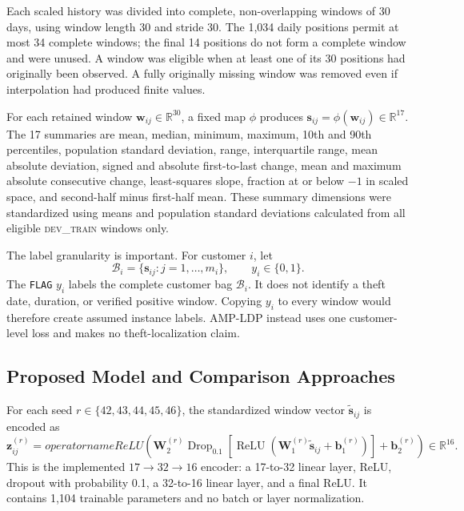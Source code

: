 Each scaled history was divided into complete, non-overlapping windows of 30 days, using window length 30 and stride 30. The 1,034 daily positions permit at most 34 complete windows; the final 14 positions do not form a complete window and were unused. A window was eligible when at least one of its 30 positions had originally been observed. A fully originally missing window was removed even if interpolation had produced finite values.

For each retained window $\mathbf{w}_{ij}\in\mathbb{R}^{30}$, a fixed map $\phi$ produces $\mathbf{s}_{ij}=\phi(\mathbf{w}_{ij})\in\mathbb{R}^{17}$. The 17 summaries are mean, median, minimum, maximum, 10th and 90th percentiles, population standard deviation, range, interquartile range, mean absolute deviation, signed and absolute first-to-last change, mean and maximum absolute consecutive change, least-squares slope, fraction at or below $-1$ in scaled space, and second-half minus first-half mean. These summary dimensions were standardized using means and population standard deviations calculated from all eligible \textsc{dev\_train} windows only.

The label granularity is important. For customer $i$, let
\begin{equation}
  \mathcal{B}_i=\{\mathbf{s}_{ij}:j=1,\ldots,m_i\},
  \qquad y_i\in\{0,1\}.
  \label{eq:bag}
\end{equation}
The \texttt{FLAG} $y_i$ labels the complete customer bag $\mathcal{B}_i$. It does not identify a theft date, duration, or verified positive window. Copying $y_i$ to every window would therefore create assumed instance labels. AMP-LDP instead uses one customer-level loss and makes no theft-localization claim.

\subsection{Proposed Model and Comparison Approaches}\label{sec:model}

For each seed $r\in\{42,43,44,45,46\}$, the standardized window vector $\widetilde{\mathbf{s}}_{ij}$ is encoded as
\begin{equation}
 \mathbf{z}_{ij}^{(r)}=operatorname{ReLU}\!\left(
 \mathbf{W}_{2}^{(r)}\operatorname{Drop}_{0.1}\!\left[
 \operatorname{ReLU}\!\left(\mathbf{W}_{1}^{(r)}\widetilde{\mathbf{s}}_{ij}
 +\mathbf{b}_{1}^{(r)}\right)\right]+\mathbf{b}_{2}^{(r)}\right)
 \in\mathbb{R}^{16}.
 \label{eq:encoder}
\end{equation}
This is the implemented $17\rightarrow32\rightarrow16$ encoder: a 17-to-32 linear layer, ReLU, dropout with probability 0.1, a 32-to-16 linear layer, and a final ReLU. It contains 1,104 trainable parameters and no batch or layer normalization.

